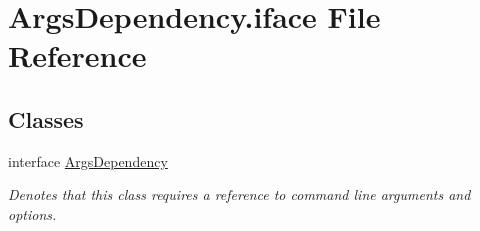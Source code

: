 \hypertarget{ArgsDependency_8iface}{\section{Args\-Dependency.\-iface File Reference}
\label{ArgsDependency_8iface}
}
\subsection*{Classes}
\begin{DoxyCompactItemize}
\item 
interface \hyperlink{interfaceArgsDependency}{Args\-Dependency}
\begin{DoxyCompactList}\small\item\em Denotes that this class requires a reference to command line arguments and options. \end{DoxyCompactList}\end{DoxyCompactItemize}
